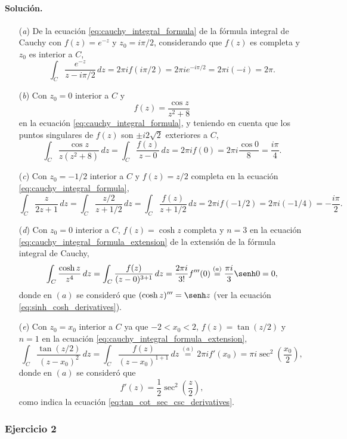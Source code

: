 \documentclass[a4paper]{report}
\begin{document}
\paragraph{Solución.} 
\begin{enumerate}
 \item[(\textit{a})] De la ecuación \ref{eq:cauchy_integral_formula} de la fórmula integral de Cauchy con \(f(z)=e^{-z}\)   y \(z_0=i\pi/2\), considerando que \(f(z)\) es completa y \(z_0\) es interior a \(C\),
 \[
  \int_C\frac{e^{-z}}{z-i\pi/2}\,dz=2\pi if(i\pi/2)=2\pi i e^{-i\pi/2}=2\pi i(-i)=2\pi.
 \]
 \item[(\textit{b})] Con \(z_0=0\) interior a \(C\) y 
 \[
  f(z)=\frac{\cos z}{z^2+8}
 \]
 en la ecuación \ref{eq:cauchy_integral_formula}, y teniendo en cuenta que los puntos singulares de \(f(z)\) son \(\pm i2\sqrt{2}\) exteriores a \(C\),
 \[
  \int_C\frac{\cos z}{z(z^2+8)}\,dz=\int_C\frac{f(z)}{z-0}\,dz=2\pi if(0)=2\pi i\frac{\cos0}{8}=\frac{i\pi}{4}.
 \]
 \item[(\textit{c})] Con \(z_0=-1/2\) interior a \(C\) y \(f(z)=z/2\) completa en la ecuación \ref{eq:cauchy_integral_formula},
 \[
  \int_C\frac{z}{2z+1}\,dz=\int_C\frac{z/2}{z+1/2}\,dz=\int_C\frac{f(z)}{z+1/2}\,dz=2\pi if(-1/2)=2\pi i(-1/4)=-\frac{i\pi}{2}.
 \]
 \item[(\textit{d})] Con \(z_0=0\) interior a \(C\), \(f(z)=\cosh z\) completa y \(n=3\) en la ecuación \ref{eq:cauchy_integral_formula_extension} de la extensión de la fórmula integral de Cauchy,
 \[
  \int_C\frac{\cosh z}{z^4}\,dz=\int_C\frac{f(z)}{(z-0)^{3+1}}\,dz=\frac{2\pi i}{3!}f'''(0)\overset{(a)}{=}\frac{\pi i}{3}\senh0=0,
 \]
 donde en \((a)\) se consideró que \((\cosh z)'''=\senh z\) (ver la ecuación \ref{eq:sinh_cosh_derivatives}).
 \item[(\textit{e})] Con \(z_0=x_0\) interior a \(C\) ya que \(-2<x_0<2\), \(f(z)=\tan(z/2)\) y \(n=1\) en la ecuación \ref{eq:cauchy_integral_formula_extension},
 \[
  \int_C\frac{\tan(z/2)}{(z-x_0)^2}\,dz=\int_C\frac{f(z)}{(z-x_0)^{1+1}}\,dz\overset{(a)}{=}2\pi if'(x_0)=\pi i\sec^2\left(\frac{x_0}{2}\right),
 \]
 donde en \((a)\) se consideró que 
 \[
  f'(z)=\frac{1}{2}\sec^2\left(\frac{z}{2}\right),
 \]
 como indica la ecuación \ref{eq:tan_cot_sec_csc_derivatives}.
\end{enumerate}

\subsubsection*{Ejercicio 2}
\end{document}
